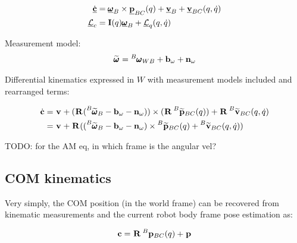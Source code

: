 \documentclass[11pt]{article}
\newcommand{\Rot}[2]{\prescript{#1}{}{\bfR}_{#2}}
\newcommand{\noise}{\bfn}
\newcommand{\posiv}[1]{\underline{\bfp}_{#1}}
\newcommand{\posi}[2]{\prescript{#1}{}{\bfp}_{#2}}
\newcommand{\posim}[2]{\prescript{#1}{}{\widetilde{\bfp}}_{#2}}
\newcommand{\velv}[1]{\underline{\bfv}_{#1}}
\newcommand{\vel}[2]{\prescript{#1}{}{\bfv}_{#2}}
\newcommand{\velm}[2]{\prescript{#1}{}{\widetilde{\bfv}}_{#2}}
\newcommand{\angvelv}[1]{\underline{\pmb{\omega}}_{#1}}
\newcommand{\angvel}[2]{\prescript{#1}{}{\pmb{\omega}}_{#2}}
\newcommand{\angvelm}[2]{\prescript{#1}{}{\widetilde{\pmb{\omega}}}_{#2}}
\newcommand{\AM}{\mathcal{L}}
\newcommand{\AMv}{\underline{\mathcal{L}}}
\newcommand{\COM}{\bfc}
\newcommand{\COMv}{\underline{\bfc}}
\begin{document}
\begin{equation}
\begin{split}
\dot{\COMv} &= \angvelv{B} \times \posiv{BC}(q) + \velv{B} + \velv{BC}(q,\dot{q}) 
\\
\AMv_c &= \bfI(q) \angvelv{B} + \AMv_q (q,\dot{q})   
\end{split}
\end{equation}

Measurement model:
\begin{align}
    \angvelm{}{} = \angvel{B}{WB} + \bfb_{\omega} + \noise_{\omega}
\end{align}

Differential kinematics expressed in $W$ with measurement models included and rearranged terms:

\begin{equation}
\begin{split}
\dot{\COM} &= \vel{}{} + (\Rot{}{}(\angvelm{B}{B} - \bfb_{\omega} - \noise_{\omega})) \times (\Rot{}{}\posim{B}{BC}(q)) + \Rot{}{}\velm{B}{BC}(q,\dot{q}) 
\\
&= \vel{}{} + \Rot{}{}((\angvelm{B}{B} - \bfb_{\omega} - \noise_{\omega}) \times \posim{B}{BC}(q) + \velm{B}{BC}(q,\dot{q}))
\\
\end{split}
\end{equation}

TODO: for the AM eq, in which frame is the angular vel?





\subsection{COM kinematics}
Very simply, the COM position (in the world frame) can be recovered from kinematic measurements and the current robot body frame pose estimation as:

\begin{equation}
    \COM = \Rot{}{} \posi{B}{BC}(q) + \posi{}{}
\end{equation}
\end{document}
